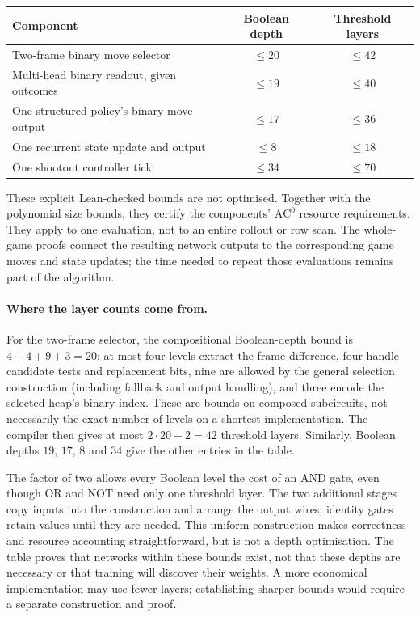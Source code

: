 \documentclass[twoside,11pt]{article}
\newcommand{\AC}{\mathrm{AC}}
\numberwithin{theorem}{section}
\numberwithin{equation}{section}
\begin{document}
\begin{center}
\begin{tabular}{lcc}
\hline
\textbf{Component} & \textbf{Boolean depth} & \textbf{Threshold layers} \\
\hline
Two-frame binary move selector & $\le20$ & $\le42$ \\
Multi-head binary readout, given outcomes & $\le19$ & $\le40$ \\
One structured policy's binary move output & $\le17$ & $\le36$ \\
One recurrent state update and output & $\le8$ & $\le18$ \\
One shootout controller tick & $\le34$ & $\le70$ \\
\hline
\end{tabular}
\end{center}
These explicit Lean-checked bounds are not optimised. Together with the polynomial size bounds, they certify the components' $\AC^0$ resource requirements. They apply to one evaluation, not to an entire rollout or row scan. The whole-game proofs connect the resulting network outputs to the corresponding game moves and state updates; the time needed to repeat those evaluations remains part of the algorithm.

\paragraph{Where the layer counts come from.}
\label{par:depth-accounting}
For the two-frame selector, the compositional Boolean-depth bound is $4+4+9+3=20$: at most four levels extract the frame difference, four handle candidate tests and replacement bits, nine are allowed by the general selection construction (including fallback and output handling), and three encode the selected heap's binary index. These are bounds on composed subcircuits, not necessarily the exact number of levels on a shortest implementation. The compiler then gives at most $2\cdot20+2=42$ threshold layers. Similarly, Boolean depths $19$, $17$, $8$ and $34$ give the other entries in the table.

The factor of two allows every Boolean level the cost of an AND gate, even though OR and NOT need only one threshold layer. The two additional stages copy inputs into the construction and arrange the output wires; identity gates retain values until they are needed. This uniform construction makes correctness and resource accounting straightforward, but is not a depth optimisation. The table proves that networks within these bounds exist, not that these depths are necessary or that training will discover their weights. A more economical implementation may use fewer layers; establishing sharper bounds would require a separate construction and proof.
\end{document}

